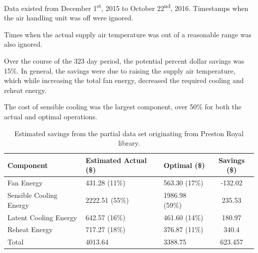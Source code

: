 Data existed from December 1\textsuperscript{st}, 2015 to October
22\textsuperscript{nd}, 2016. Timestamps when the air handling unit was
off were ignored. 

Times when the actual supply air temperature was out of a reasonable
range was also ignored. 

Over the course of the 323 day period, the potential percent dollar     
savings was 15\%. In general, the savings were due to raising the       
supply air temperature, which while increasing the total fan energy,    
decreased the required cooling and reheat energy.                       

The cost of sensible cooling was the largest component, over 50\% for
both the actual and optimal operations. 

\begin{table}
\centering
\caption{Estimated savings from the partial data set originating from Preston Royal library.}
\label{tab:prestonRoyalSavings}

\begin{tabular}{lllS}
\toprule
    Component               & { Estimated Actual (\$) } & { Optimal (\$) }     & { Savings (\$) } \\ \midrule
    Fan Energy              & \num{431.28} (11\%)       & \num{563.30} (17\%)  & -132.02          \\
    Sensible Cooling Energy & \num{2222.51} (55\%)      & \num{1986.98} (59\%) & 235.53           \\
    Latent Cooling Energy   & \num{642.57} (16\%)       & \num{461.60} (14\%)  & 180.97           \\
    Reheat Energy           & \num{717.27} (18\%)       & \num{376.87}  (11\%) & 340.4            \\ \midrule
    Total                   & \num{4013.64}             & \num{3388.75}        & 623.457          \\ \bottomrule
\end{tabular}

\end{table}




